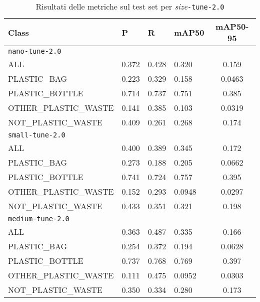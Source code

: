 \begin{table}[!htb]
    \centering
    \begin{tabularx}{\textwidth}{lYYYc}
        \toprule
        Class & P & R & mAP50 & mAP50-95 \\
        \midrule
        \texttt{nano-tune-2.0} \\
        \midrule
        ALL & 0.372 & 0.428 & 0.320 & 0.159 \\
        PLASTIC\_BAG & 0.223 & 0.329 & 0.158 & 0.0463 \\
        PLASTIC\_BOTTLE & 0.714 & 0.737 & 0.751 & 0.385 \\
        OTHER\_PLASTIC\_WASTE & 0.141 & 0.385 & 0.103 & 0.0319 \\
        NOT\_PLASTIC\_WASTE & 0.409 & 0.261 & 0.268 & 0.174 \\
        \midrule
        \texttt{small-tune-2.0} \\
        \midrule
        ALL & 0.400 & 0.389 & 0.345 & 0.172 \\
        PLASTIC\_BAG & 0.273 & 0.188 & 0.205 & 0.0662 \\
        PLASTIC\_BOTTLE & 0.741 & 0.724 & 0.757 & 0.395 \\
        OTHER\_PLASTIC\_WASTE & 0.152 & 0.293 & 0.0948 & 0.0297 \\
        NOT\_PLASTIC\_WASTE & 0.433 & 0.351 & 0.321 & 0.198 \\
        \midrule
        \texttt{medium-tune-2.0} \\
        \midrule
        ALL & 0.363 & 0.487 & 0.335 & 0.166 \\
        PLASTIC\_BAG & 0.254 & 0.372 & 0.194 & 0.0628 \\
        PLASTIC\_BOTTLE & 0.737 & 0.768 & 0.769 & 0.397 \\
        OTHER\_PLASTIC\_WASTE & 0.111 & 0.475 & 0.0952 & 0.0303 \\
        NOT\_PLASTIC\_WASTE & 0.350 & 0.334 & 0.280 & 0.173 \\
        \bottomrule
    \end{tabularx}
    \caption{Risultati delle metriche sul test set per \textit{size}\texttt{-tune-2.0}}
    \label{table:v6-2}
\end{table}

